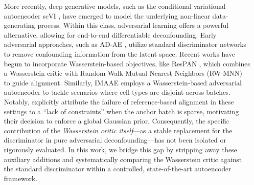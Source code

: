 \documentclass[unnumsec,webpdf,contemporary,large]{oup-authoring-template}%
\theoremstyle{thmstyleone}%
\theoremstyle{thmstyletwo}%
\theoremstyle{thmstylethree}%
\begin{document}
More recently, deep generative models, such as the conditional variational autoencoder scVI \citep{Lopez2018-bl}, have emerged to model the underlying non-linear data-generating process. Within this class, adversarial learning offers a powerful alternative, allowing for end-to-end differentiable deconfounding. Early adversarial approaches, such as AD-AE \citep{10.1093/bioinformatics/btaa796}, utilize standard discriminator networks to remove confounding information from the latent space. Recent works have begun to incorporate Wasserstein-based objectives, like ResPAN \citep{10.1093/bioinformatics/btac427}, which combines a Wasserstein critic with Random Walk Mutual Nearest Neighbors (RW-MNN) to guide alignment. Similarly, IMAAE \citep{ijms24065502} employs a Wasserstein-based adversarial autoencoder to tackle scenarios where cell types are disjoint across batches. Notably, \citeauthor{ijms24065502} explicitly attribute the failure of reference-based alignment in these settings to a ``lack of constraints'' when the anchor batch is sparse, motivating their decision to enforce a global Gaussian prior. Consequently, the specific contribution of the \textit{Wasserstein critic itself}---as a stable replacement for the discriminator in pure adversarial deconfounding—has not been isolated or rigorously evaluated. In this work, we bridge this gap by stripping away these auxiliary additions and systematically comparing the Wasserstein critic against the standard discriminator within a controlled, state-of-the-art autoencoder framework.
\end{document}
